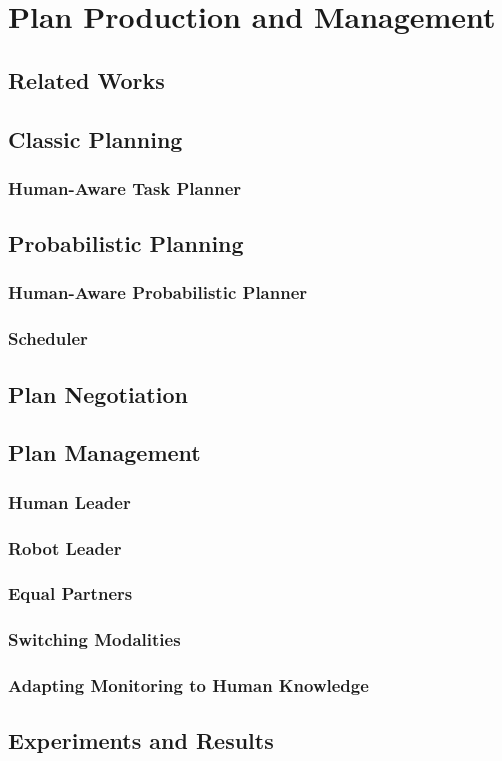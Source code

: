 
\chapter{Plan Production and Management} %

\label{chapter-plan production and management} %



\section{Related Works}


\section{Classic Planning}
\subsection{Human-Aware Task Planner}

\section{Probabilistic Planning}
\subsection{Human-Aware Probabilistic Planner}
\subsection{Scheduler}

\section{Plan Negotiation}

\section{Plan Management}
\subsection{Human Leader}
\subsection{Robot Leader}
\subsection{Equal Partners}
\subsection{Switching Modalities}
\subsection{Adapting Monitoring to Human Knowledge}


\section{Experiments and Results}


